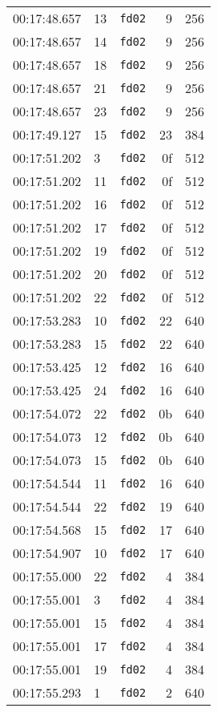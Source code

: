 \documentclass{article}
\begin{document}
\begin{longtable}{lllrr}
00:17:48.657 & 13 & \texttt{fd02} & 9 & 256 \\
00:17:48.657 & 14 & \texttt{fd02} & 9 & 256 \\
00:17:48.657 & 18 & \texttt{fd02} & 9 & 256 \\
00:17:48.657 & 21 & \texttt{fd02} & 9 & 256 \\
00:17:48.657 & 23 & \texttt{fd02} & 9 & 256 \\
00:17:49.127 & 15 & \texttt{fd02} & 23 & 384 \\
00:17:51.202 & 3 & \texttt{fd02} & 0f & 512 \\
00:17:51.202 & 11 & \texttt{fd02} & 0f & 512 \\
00:17:51.202 & 16 & \texttt{fd02} & 0f & 512 \\
00:17:51.202 & 17 & \texttt{fd02} & 0f & 512 \\
00:17:51.202 & 19 & \texttt{fd02} & 0f & 512 \\
00:17:51.202 & 20 & \texttt{fd02} & 0f & 512 \\
00:17:51.202 & 22 & \texttt{fd02} & 0f & 512 \\
00:17:53.283 & 10 & \texttt{fd02} & 22 & 640 \\
00:17:53.283 & 15 & \texttt{fd02} & 22 & 640 \\
00:17:53.425 & 12 & \texttt{fd02} & 16 & 640 \\
00:17:53.425 & 24 & \texttt{fd02} & 16 & 640 \\
00:17:54.072 & 22 & \texttt{fd02} & 0b & 640 \\
00:17:54.073 & 12 & \texttt{fd02} & 0b & 640 \\
00:17:54.073 & 15 & \texttt{fd02} & 0b & 640 \\
00:17:54.544 & 11 & \texttt{fd02} & 16 & 640 \\
00:17:54.544 & 22 & \texttt{fd02} & 19 & 640 \\
00:17:54.568 & 15 & \texttt{fd02} & 17 & 640 \\
00:17:54.907 & 10 & \texttt{fd02} & 17 & 640 \\
00:17:55.000 & 22 & \texttt{fd02} & 4 & 384 \\
00:17:55.001 & 3 & \texttt{fd02} & 4 & 384 \\
00:17:55.001 & 15 & \texttt{fd02} & 4 & 384 \\
00:17:55.001 & 17 & \texttt{fd02} & 4 & 384 \\
00:17:55.001 & 19 & \texttt{fd02} & 4 & 384 \\
00:17:55.293 & 1 & \texttt{fd02} & 2 & 640 \\

\end{longtable}
\end{document}
